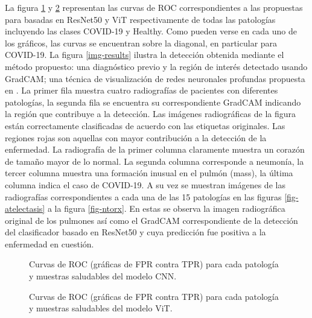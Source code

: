 La figura \ref{roc-curves-cnn} y \ref{roc-curves-vit} representan las curvas de ROC correspondientes
a las propuestas para basadas en ResNet50 y ViT respectivamente de todas las patologías incluyendo las
clases COVID-19 y Healthy. Como pueden verse en cada uno de los
gráficos, las curvas se encuentran sobre la diagonal, en particular para COVID-19. La figura
\ref{img-results} ilustra la detección obtenida mediante el método propuesto: una diagnóstico previo
y la región de interés detectado usando GradCAM; una técnica de visualización de redes neuronales
profundas propuesta en \cite{selvaraju2017grad}. La primer fila muestra cuatro radiografías de
pacientes con diferentes patologías, la segunda fila se encuentra su correspondiente GradCAM
indicando la región que contribuye a la detección. Las imágenes radiográficas de la figura están
correctamente clasificadas de acuerdo con las etiquetas originales. Las regiones rojas son aquellas
con mayor contribución a la detección de la enfermedad. La radiografía de la primer columna claramente
muestra un corazón de tamaño mayor de lo normal. La segunda columna corresponde a neumonía, la
tercer columna muestra una formación inusual en el pulmón (mass), la última columna indica el caso
de COVID-19. A su vez se muestran imágenes de las radiografías correspondientes a cada una de las 15
patologías en las figuras \ref{fig-atelectasis} a la figura \ref{fig-ntorx}. En estas se observa
la imagen radiográfica original de los pulmones así como el GradCAM correspondiente de la detección
del clasificador basado en ResNet50 y cuya predicción fue positiva a la enfermedad en cuestión.

\begin{figure}
    \begin{center}
        \scalebox{0.6}{}
    \end{center}
    \caption{Curvas de ROC (gráficas de FPR contra TPR) para cada patología y muestras saludables
    del modelo CNN.}
    \label{roc-curves-cnn}
\end{figure}

\begin{figure}
    \begin{center}
        \scalebox{0.6}{}
    \end{center}
    \caption{Curvas de ROC (gráficas de FPR contra TPR) para cada patología y muestras saludables
             del modelo ViT.}
    \label{roc-curves-vit}
\end{figure}

